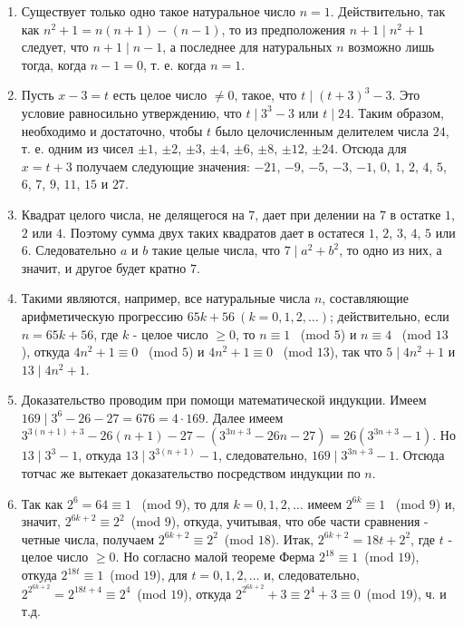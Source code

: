 \documentclass[12pt, a4paper, openany]{book}
\begin{document}
\begin{enumerate}
	\item Существует только одно такое натуральное число $n=1$. Действительно, так как $n^2+1=n(n+1)-(n-1)$, то из предположения $n+1 \mid n^2+1$ следует, что $n+1 \mid n-1$, а последнее для натуральных $n$ возможно лишь тогда, когда $n-1=0$, т. е. когда $n=1$.
	\item Пусть $x-3=t$ есть целое число $\neq0$, такое, что $t \mid (t+3)^3-3$. Это условие равносильно утверждению, что $t \mid 3^3-3$ или $t \mid 24$. Таким образом, необходимо и достаточно, чтобы $t$ было целочисленным делителем числа $24$, т. е. одним из чисел $\pm1$, $\pm2$, $\pm3$, $\pm4$, $\pm6$, $\pm8$, $\pm12$, $\pm24$. Отсюда для $x=t+3$ получаем следующие значения: $-21$, $-9$, $-5$, $-3$, $-1$, $0$, $1$, $2$, $4$, $5$, $6$, $7$, $9$, $11$, $15$ и $27$.
	\item Квадрат целого числа, не делящегося на $7$, дает при делении на $7$ в остатке $1$, $2$ или $4$. Поэтому сумма двух таких квадратов дает в остатеся $1$, $2$, $3$, $4$, $5$ или $6$. Следовательно $a$ и $b$ такие целые числа, что $7 \mid a^2 + b^2$, то одно из них, а значит, и другое будет кратно $7$.
	\item Такими являются, например, все натуральные числа $n$, составляющие арифметическую прогрессию $65k+56 \ (k=0, 1, 2, \ldots)$; действительно, если $n=65k+56$, где $k$ - целое число $\geqslant 0$, то $n \equiv 1$ \  (mod $5$) и $n \equiv 4$ \ (mod $13$), откуда $4n^2+1 \equiv 0$ \ (mod $5$) и $4n^2+1 \equiv 0$ \ (mod $13$), так что $5 \mid 4n^2+1$ и $13 \mid 4n^2+1$.
	\item Доказательство проводим при помощи математической индукции. Имеем $169 \mid 3^6 - 26 - 27 = 676 = 4 \cdot  169$. Далее имеем $3^{3(n+1)+3} - 26 (n+1) - 27 - (3^{3n+3}-26n-27)=26(3^{3n+3}-1)$. Но $13 \mid 3^3-1$, откуда $13 \mid 3^{3(n+1)}-1$, следовательно, $169 \mid 3^{3n+3}-1$. Отсюда тотчас же вытекает доказательство посредством индукции по $n$.
	\item Так как $2^6=64\equiv1$ \ (mod $9$), то для $k=0,1,2, \dots$ имеем $2^{6k}\equiv1$ \ (mod $9$) и, значит, $2^{6k+2}\equiv2^2$\ (mod $9$), откуда, учитывая, что обе части сравнения - четные числа, получаем $2^{6k+2}\equiv2^2$\ (mod $18$). Итак, $2^{6k+2}=18t+2^2$, где $t$ - целое число $\geqslant 0$. Но согласно малой теореме Ферма $2^{18}\equiv1$\ (mod $19$), откуда $2^{18t}\equiv1$\ (mod $19$), для $t=0,1,2, \dots$ и, следовательно, $2^{2^{6k+2}}=2^{18t+4}\equiv2^4$\ (mod $19$), откуда $2^{2^{6k+2}}+3\equiv2^4+3\equiv0$\ (mod $19$), ч. и т.д.

\end{enumerate}
\end{document}
